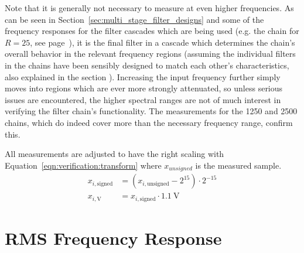 Note that it is generally not necessary to measure at even higher frequencies.
As can be seen in Section~\ref{sec:multi_stage_filter_designs} and some of the
frequency responses  for the filter  cascades which  are being used  (e.g. the
chain for  $R=25$, see page~\pageref{images/fdesign/chain25.tikz}), it  is the
final filter in a cascade which determines the chain's overall behavior in the
relevant frequency regions (assuming the individual filters in the chains have
been sensibly designed  to match each other's  characteristics, also explained
in  the section  \emph{}).  Increasing
the input  frequency further  simply moves  into regions  which are  ever more
strongly  attenuated, so  unless serious  issues are  encountered, the  higher
spectral  ranges are  not of  much interest  in verifying  the filter  chain's
functionality. The  measurements for  the  \num{1250}  and \num{2500}  chains,
which do indeed cover more than the necessary frequency range, confirm this.

All   measurements   are   adjusted   to   have   the   right   scaling   with
Equation~\ref{eqn:verification:transform} where $x_{unsigned}$ is the measured
sample.
\begin{align}
    \label{eqn:verification:transform}
    x_{i,\mathrm{signed}} &= \left(x_{i,\mathrm{unsigned}} - 2^{15}\right) \cdot 2^{-15} \\
    x_{i,\mathrm{V}}      &= x_{i,\mathrm{signed}} \cdot \SI{1.1}{\V}
\end{align}

%
%
\section{RMS Frequency Response} %
\label{sec:verification:rms}

